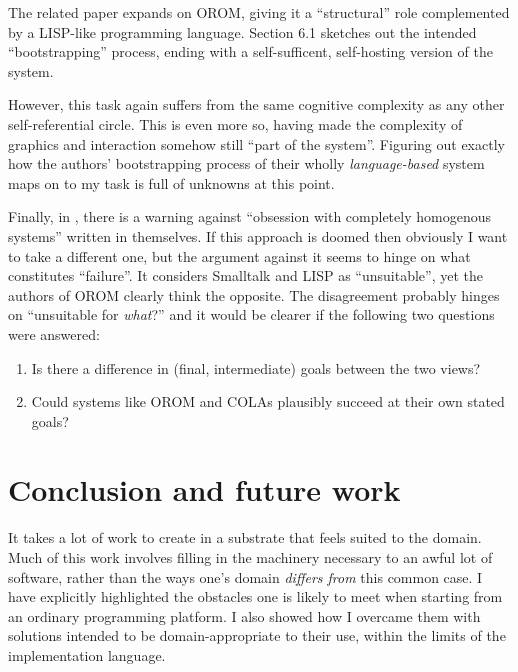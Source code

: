 The related paper \cite{COLAs} expands on OROM, giving it a
``structural'' role complemented by a LISP-like programming language.
Section 6.1 sketches out the intended ``bootstrapping'' process, ending
with a self-sufficent, self-hosting version of the system.

However, this task again suffers from the same cognitive complexity as
any other self-referential circle. This is even more so, having made the
complexity of graphics and interaction somehow still ``part of the
system''. Figuring out exactly how the authors' bootstrapping process of
their wholly \emph{language-based} system maps on to my task is full of
unknowns at this point.

Finally, in \cite{crit-semprola}, there is a warning against ``obsession
with completely homogenous systems'' written in themselves. If this
approach is doomed then obviously I want to take a different one, but
the argument against it seems to hinge on what constitutes ``failure''.
It considers Smalltalk and LISP as ``unsuitable'', yet the authors of
OROM clearly think the opposite. The disagreement probably hinges on
``unsuitable for \emph{what}?'' and it would be clearer if the following
two questions were answered:

\begin{enumerate}
\def\labelenumi{\arabic{enumi}.}
\tightlist
\item
  Is there a difference in (final, intermediate) goals between the two
  views?
\item
  Could systems like OROM and COLAs plausibly succeed at their own
  stated goals?
\end{enumerate}

\hypertarget{conclusion-and-future-work}{%
\section{Conclusion and future work}\label{conclusion-and-future-work}}

It takes a lot of work to create in a substrate that feels suited to the
domain. Much of this work involves filling in the machinery necessary to
an awful lot of software, rather than the ways one's domain
\emph{differs from} this common case. I have explicitly highlighted the
obstacles one is likely to meet when starting from an ordinary
programming platform. I also showed how I overcame them with solutions
intended to be domain-appropriate to their use, within the limits of the
implementation language.

